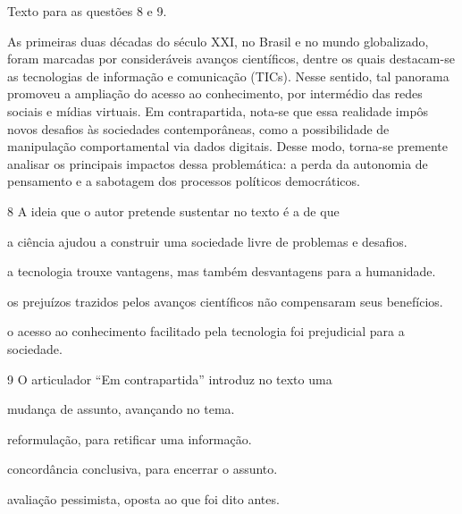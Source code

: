 Texto para as questões 8 e 9.

\begin{myquote}
As primeiras duas décadas do século XXI, no Brasil e no mundo
globalizado, foram marcadas por consideráveis avanços científicos,
dentre os quais destacam-se as tecnologias de informação e comunicação
(TICs). Nesse sentido, tal panorama promoveu a ampliação do acesso ao
conhecimento, por intermédio das redes sociais e mídias virtuais. Em
contrapartida, nota-se que essa realidade impôs novos desafios às
sociedades contemporâneas, como a possibilidade de manipulação
comportamental via dados digitais. Desse modo, torna-se premente
analisar os principais impactos dessa problemática: a perda da autonomia
de pensamento e a sabotagem dos processos políticos democráticos.

\end{myquote}

\num{8} A ideia que o autor pretende sustentar no texto é a de que

\begin{escolha}
\item a ciência ajudou a construir uma sociedade livre de problemas e desafios.

\item a tecnologia trouxe vantagens, mas também desvantagens para a humanidade.

\item os prejuízos trazidos pelos avanços científicos não compensaram seus benefícios.

\item o acesso ao conhecimento facilitado pela tecnologia foi prejudicial para a sociedade.
\end{escolha}

\num{9} 
O articulador ``Em contrapartida'' introduz no texto uma

\begin{escolha}
\item mudança de assunto, avançando no tema.

\item reformulação, para retificar uma informação.

\item concordância conclusiva, para encerrar o assunto.

\item avaliação pessimista, oposta ao que foi dito antes.
\end{escolha}

